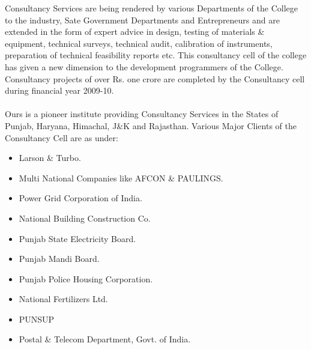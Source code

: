 Consultancy Services are being rendered by various Departments of the College to the
industry, Sate Government Departments and Entrepreneurs and are extended in the form of
expert advice in design, testing of materials \& equipment, technical surveys, technical audit,
calibration of instruments, preparation of technical feasibility reports etc.
This consultancy cell of the college has given a new dimension to the development
programmers of the College. Consultancy projects of over Rs. one crore are completed by the
Consultancy cell during financial year 2009-10. \\ \\
Ours is a pioneer institute providing Consultancy Services in the States of Punjab, Haryana,
Himachal, J\&K and Rajasthan. Various Major Clients of the Consultancy Cell are as under:\\
\begin{itemize}
\item Larson \& Turbo.
\item Multi National Companies like AFCON \& PAULINGS.
\item Power Grid Corporation of India.
\item National Building Construction Co.
\item Punjab State Electricity Board.
\item Punjab Mandi Board.
\item Punjab Police Housing Corporation.
\item National Fertilizers Ltd.
\item PUNSUP
\item Postal \& Telecom Department, Govt. of India.
\end{itemize}

